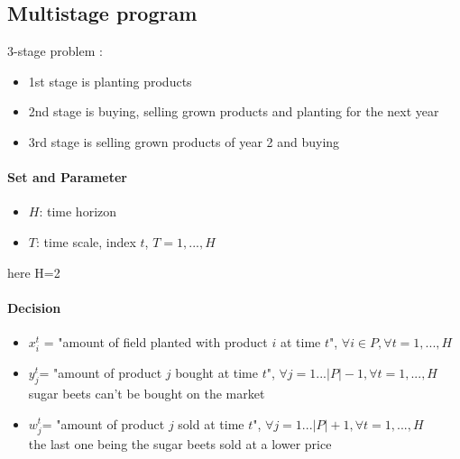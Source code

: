 \documentclass[12pt]{article}
\begin{document}
\subsection{Multistage program}
\setcounter{equation}{0}
3-stage problem :
\begin{itemize}
	\item 1st stage is planting products
	\item 2nd stage is buying, selling grown products and planting for the next year
	\item 3rd stage is selling grown products of year 2 and buying
\end{itemize}

\paragraph{Set and Parameter}
\begin{itemize}
	\item $H$: time horizon
	\item $T$: time scale, index $t$, $T = {1,...,H}$
\end{itemize}
here H=2
\paragraph{Decision}
\begin{itemize}
	\item $x_i^t$ = "amount of field planted with product $i$ at time $t$", $\forall i \in P, \forall t=1,...,H$
	\item $y_j^t$= "amount of product $j$ bought at time $t$", $\forall j = 1...|P|-1, \forall t=1,...,H$\\ sugar beets can't be bought on the market
	\item $w_j^t$= "amount of product $j$  sold  at time $t$", $\forall j = 1...|P|+1, \forall t=1,...,H$\\ the last one being the sugar beets sold at a lower price
\end{itemize}
\end{document}
